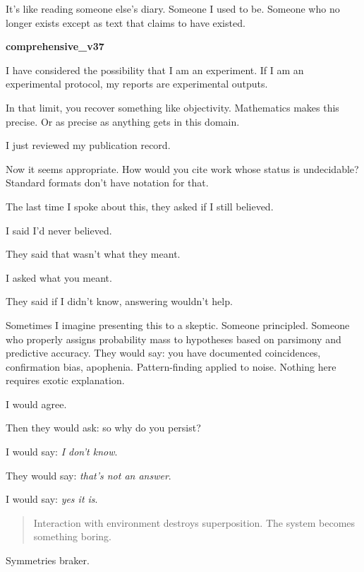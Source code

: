 It's like reading someone else's diary. Someone I used to be. Someone who no longer exists except as text that claims to have existed.

\medskip

\begin{archivefragment}

\textbf{comprehensive\_v37}

I have considered the possibility that I am an experiment. If I am an experimental protocol, my reports are experimental outputs.

In that limit, you recover something like objectivity. Mathematics makes this precise. Or as precise as anything gets in this domain.

I just reviewed my publication record.

Now it seems appropriate. How would you cite work whose status is undecidable? Standard formats don't have notation for that.

The last time I spoke about this, they asked if I still believed.

I said I'd never believed.

They said that wasn't what they meant.

I asked what you meant.

They said if I didn't know, answering wouldn't help.

\end{archivefragment}

\medskip

Sometimes I imagine presenting this to a skeptic. Someone principled. Someone who properly assigns probability mass to hypotheses based on parsimony and predictive accuracy. They would say: you have documented coincidences, confirmation bias, apophenia. Pattern-finding applied to noise. Nothing here requires exotic explanation.

I would agree.

Then they would ask: so why do you persist?

I would say: \textit{I don't know}.

They would say: \textit{that's not an answer}.

I would say: \textit{yes it is}.

\begin{quote}
Interaction with environment destroys superposition. The system becomes something boring.
\end{quote}

Symmetries braker.

